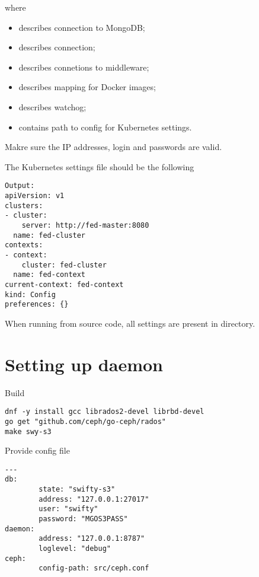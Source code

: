 where
\begin{itemize}
\item{ describes connection to MongoDB;}
\item{ describes  connection;}
\item{ describes connetions to middleware;}
\item{ describes mapping for Docker images;}
\item{ describes  watchog;}
\item{ contains path to config for Kubernetes settings.}
\end{itemize}

Makre sure the IP addresses, login and passwords are valid.

The Kubernetes settings file should be the following

\begin{lstlisting}
Output:
apiVersion: v1
clusters:
- cluster:
    server: http://fed-master:8080
  name: fed-cluster
contexts:
- context:
    cluster: fed-cluster
  name: fed-context
current-context: fed-context
kind: Config
preferences: {}
\end{lstlisting}

When running from  source code, all settings are present
in  directory.

\section{Setting up  daemon}
\label{sec:setup-swy-s3}


Build 

\begin{lstlisting}
dnf -y install gcc librados2-devel librbd-devel
go get "github.com/ceph/go-ceph/rados"
make swy-s3
\end{lstlisting}

Provide config file 

\begin{lstlisting}
---
db:
        state: "swifty-s3"
        address: "127.0.0.1:27017"
        user: "swifty"
        password: "MGOS3PASS"
daemon:
        address: "127.0.0.1:8787"
        loglevel: "debug"
ceph:
        config-path: src/ceph.conf
\end{lstlisting}


